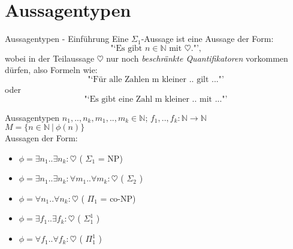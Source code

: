 \section{Aussagentypen}



\begin{frame}[c]{Aussagentypen - Einführung}
    \large
    Eine $\Sigma_1$-Aussage ist eine Aussage der Form: \\
    \[ \text{"`Es gibt $n \in \mathbb{N}$ mit $\heartsuit$."',}\]
        \pause
    wobei in der Teilaussage $\heartsuit$ nur noch {\em beschränkte Quantifikatoren} vorkommen dürfen, also Formeln wie:
    \pause
    \[ \text{"`Für alle Zahlen m kleiner .. gilt ..."'} \]
    oder
    \[ \text{"`Es gibt eine Zahl m kleiner .. mit ..."'} \]

\end{frame}


\begin{frame}[c]{Aussagentypen}
    \Large
    $n_1, .., n_k, m_1, .., m_k \in \mathbb{N}$;
     {$f_1, .., f_k : \mathbb{N} \rightarrow \mathbb{N}$} \\
    $M = \{ n \in \mathbb{N}\ |\ \phi(n)\}$ \\

    Aussagen der Form:
    \begin{itemize}
            \pause
        \item $\phi = \exists n_1 .. \exists n_k: \heartsuit$ ( $\Sigma_1$  { = NP})
            \pause
        \item $\phi = \exists n_1 .. \exists n_k: \forall m_1 .. \forall m_k: \heartsuit$ ( $\Sigma_2$ )
            \pause
        \item $\phi = \forall n_1 .. \forall n_k: \heartsuit$ ( $\Pi_1$  { = co-NP})
            \pause
        \item $\phi = \exists f_1 .. \exists f_k: \heartsuit$ ( $\Sigma_1^1$ )
            \pause
        \item $\phi = \forall f_1 .. \forall f_k: \heartsuit$ ( $\Pi_1^1$ )
    \end{itemize}

\end{frame}


